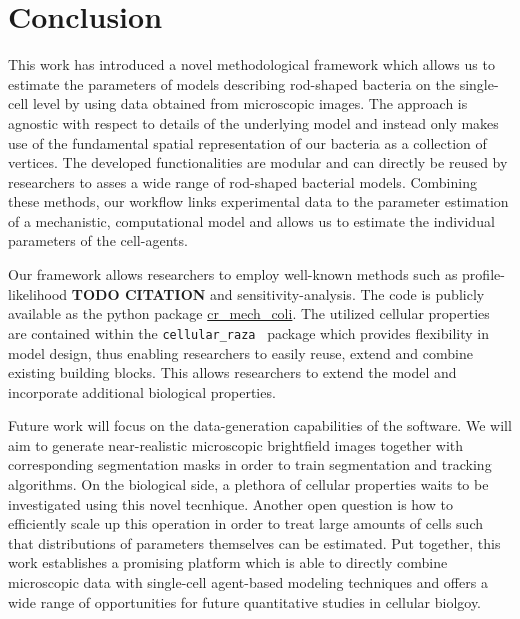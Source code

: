 \documentclass[10pt,letterpaper]{article}
\begin{document}
\section{Conclusion}

This work has introduced a novel methodological framework which allows us to estimate the parameters
of models describing rod-shaped bacteria on the single-cell level by using data obtained from
microscopic images.
The approach is agnostic with respect to details of the underlying model and instead only makes use
of the fundamental spatial representation of our bacteria as a collection of vertices.
The developed functionalities are modular and can directly be reused by researchers to asses a wide
range of rod-shaped bacterial models.
Combining these methods, our workflow links experimental data to the parameter estimation of a
mechanistic, computational model and allows us to estimate the individual parameters of the
cell-agents.

Our framework allows researchers to employ well-known methods such as profile-likelihood
\textbf{TODO CITATION} and sensitivity-analysis.
The code is publicly available as the python package
\href{https://github.com/jonaspleyer/cr_mech_coli}{cr\_mech\_coli}.
The utilized cellular properties are contained within the \texttt{cellular\_raza}~\cite{Pleyer2025}
package which provides flexibility in model design, thus enabling researchers to easily reuse,
extend and combine existing building blocks.
This allows researchers to extend the model and incorporate additional biological properties.

Future work will focus on the data-generation capabilities of the software.
We will aim to generate near-realistic microscopic brightfield images together with corresponding
segmentation masks in order to train segmentation and tracking algorithms.
On the biological side, a plethora of cellular properties waits to be investigated using this novel
tecnhique.
Another open question is how to efficiently scale up this operation in order to treat large amounts
of cells such that distributions of parameters themselves can be estimated.
Put together, this work establishes a promising platform which is able to directly combine
microscopic data with single-cell agent-based modeling techniques and offers a wide range of
opportunities for future quantitative studies in cellular biolgoy.
\end{document}
